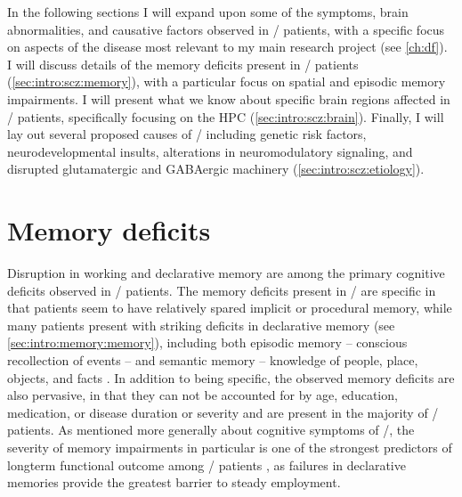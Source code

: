 In the following sections I will expand upon some of the symptoms, brain abnormalities, and causative factors observed in \scz/ patients, with a specific focus on aspects of the disease most relevant to my main research project (see \autoref{ch:df}).
I will discuss details of the memory deficits present in \scz/ patients (\autoref{sec:intro:scz:memory}), with a particular focus on spatial and episodic memory impairments.
I will present what we know about specific brain regions affected in \scz/ patients, specifically focusing on the \ac{HPC} (\autoref{sec:intro:scz:brain}).
Finally, I will lay out several proposed causes of \scz/ including genetic risk factors, neurodevelopmental insults, alterations in neuromodulatory signaling, and disrupted glutamatergic and GABAergic machinery (\autoref{sec:intro:scz:etiology}).

\section{Memory deficits}
\label{sec:intro:scz:memory}
Disruption in working and declarative memory are among the primary cognitive deficits observed in \scz/ patients.
The memory deficits present in \scz/ are specific in that patients seem to have relatively spared implicit or procedural memory, while many patients present with striking deficits in declarative memory (see \autoref{sec:intro:memory:memory}), including both episodic memory -- conscious recollection of events -- and semantic memory -- knowledge of people, place, objects, and facts \citep{O'Carroll2000, Aleman1999, Gold2010}.
In addition to being specific, the observed memory deficits are also pervasive, in that they can not be accounted for by age, education, medication, or disease duration or severity \citep{Ranganath2008} and are present in the majority of \scz/ patients.
As mentioned more generally about cognitive symptoms of \scz/, the severity of memory impairments in particular is one of the strongest predictors of longterm functional outcome among \scz/ patients \citep{Green1996}, as failures in declarative memories provide the greatest barrier to steady employment.


